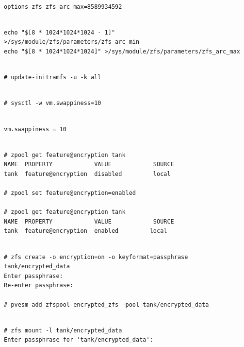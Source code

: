 \begin{lstlisting}

options zfs zfs_arc_max=8589934592

\end{lstlisting}

\begin{lstlisting}

echo "$[8 * 1024*1024*1024 - 1]" >/sys/module/zfs/parameters/zfs_arc_min
echo "$[8 * 1024*1024*1024]" >/sys/module/zfs/parameters/zfs_arc_max

\end{lstlisting}

\begin{lstlisting}

# update-initramfs -u -k all

\end{lstlisting}

\begin{lstlisting}

# sysctl -w vm.swappiness=10

\end{lstlisting}

\begin{lstlisting}

vm.swappiness = 10

\end{lstlisting}

\begin{lstlisting}

# zpool get feature@encryption tank
NAME  PROPERTY            VALUE            SOURCE
tank  feature@encryption  disabled         local

# zpool set feature@encryption=enabled

# zpool get feature@encryption tank
NAME  PROPERTY            VALUE            SOURCE
tank  feature@encryption  enabled         local

\end{lstlisting}

\begin{lstlisting}

# zfs create -o encryption=on -o keyformat=passphrase tank/encrypted_data
Enter passphrase:
Re-enter passphrase:

# pvesm add zfspool encrypted_zfs -pool tank/encrypted_data

\end{lstlisting}

\begin{lstlisting}

# zfs mount -l tank/encrypted_data
Enter passphrase for 'tank/encrypted_data':

\end{lstlisting}

